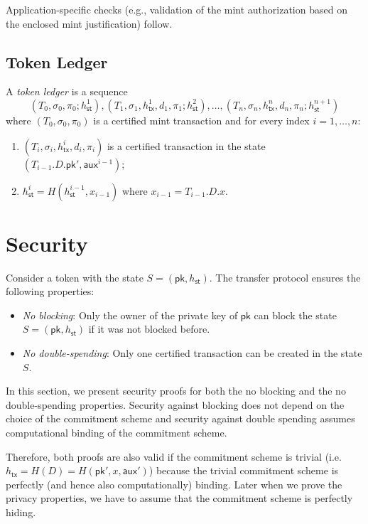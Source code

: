 \documentclass{article}
\newcommand{\pubkey}[0]{\mathsf{pk}}
\newcommand{\sthash}[0]{h_\mathsf{st}}
\newcommand{\txhash}[0]{h_\mathsf{tx}}
\newcommand{\auxd}[0]{\mathsf{aux}}
\begin{document}
\noindent Application-specific checks (e.g., validation of the mint authorization based on the enclosed mint justification) follow.

\subsection{Token Ledger}

A \emph{token ledger} is a sequence
\[
(T_0, \sigma_0, \pi_0; h^1_\mathsf{st}), (T_1, \sigma_1,\txhash^1,d_1,\pi_1; h^2_\mathsf{st}), \ldots, (T_n, \sigma_n, \txhash^n, d_n,\pi_n; h^{n+1}_\mathsf{st})
\]
where $(T_0, \sigma_0, \pi_0)$ is a certified mint transaction and for every index $i=1,\ldots, n$:
\begin{enumerate}
\item $(T_{i}, \sigma_{i}, \txhash^i,d_i, \pi_{i})$ is a certified transaction in the state $(T_{i-1}.D.\pubkey', \auxd^{i-1})$;
\item $h^{i}_\mathsf{st}=H(h^{i-1}_\mathsf{st},x_{i-1})$ where $x_{i-1} =T_{i-1}.D.x$.
\end{enumerate}

\section{Security}
Consider a token with the state $S = (\pubkey, \sthash)$. The transfer protocol ensures the following properties:
\begin{itemize}
\item \emph{No blocking}:
Only the owner of the private key of $\pubkey$ can block the state $S = (\pubkey, \sthash)$ if it was not blocked before.
\item \emph{No double-spending}:
Only one certified transaction can be created in the state $S$.
\end{itemize}

\noindent In this section, we present security proofs for both the no blocking and the no double-spending properties. Security against blocking does not depend on the choice of the commitment scheme and security against double spending assumes computational binding of the commitment scheme.

Therefore, both proofs are also valid if the commitment scheme is trivial (i.e. $\txhash = H(D)=H(\pubkey',x,\auxd')$) because the trivial commitment scheme is perfectly (and hence also computationally) binding. Later when we prove the privacy properties, we have to assume that the commitment scheme is perfectly hiding.
\end{document}
